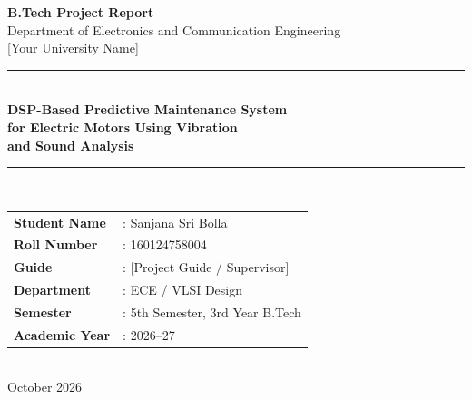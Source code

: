 \documentclass[12pt,a4paper]{article}
\begin{document}

\begin{titlepage}
  \centering
  \vspace*{1cm}

  {\Large \textbf{B.Tech Project Report}}\\[0.4cm]
  {\large Department of Electronics and Communication Engineering}\\[0.2cm]
  {\large [Your University Name]}\\[1.5cm]

  \rule{\linewidth}{1pt}\\[0.5cm]
  {\LARGE \textbf{DSP-Based Predictive Maintenance System\\[0.3cm]
  for Electric Motors Using Vibration\\[0.3cm]
  and Sound Analysis}}\\[0.5cm]
  \rule{\linewidth}{1pt}\\[1.5cm]

  \begin{tabular}{ll}
    \textbf{Student Name}  & : Sanjana Sri Bolla \\[0.4cm]
    \textbf{Roll Number}   & : 160124758004 \\[0.4cm]
    \textbf{Guide}         & : [Project Guide / Supervisor] \\[0.4cm]
    \textbf{Department}    & : ECE / VLSI Design \\[0.4cm]
    \textbf{Semester}      & : 5th Semester, 3rd Year B.Tech \\[0.4cm]
    \textbf{Academic Year} & : 2026--27 \\
  \end{tabular}\\[2.5cm]

  {\large October 2026}
\end{titlepage}
\end{document}
